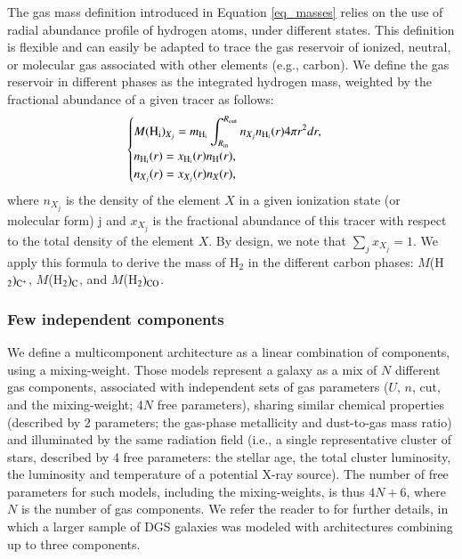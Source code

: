 \documentclass{aa}
\begin{document}
The gas mass definition introduced in Equation \ref{eq_masses} relies on the use of radial abundance profile of hydrogen atoms, under different states. This definition is flexible and can easily be adapted to trace the gas reservoir of ionized, neutral, or molecular gas associated with other elements (e.g., carbon). We define the gas reservoir in different phases as the integrated hydrogen mass, weighted by the fractional abundance of a given tracer as follows:
\begin{equation}
    \label{eq_masses_zone}
    \begin{cases}
    \displaystyle M({\rm H_i})_{X_j} = m_{\rm H_i} \int_{R_{\rm in}}^{R_{\rm out}}n_{X_j} n_{\rm H_i}(r) 4\pi r^2 dr , \\
    \displaystyle n_{\rm H_i}(r) = x_{\rm H_i}(r) n_{\rm H}(r), \\
    \displaystyle n_{X_j}(r) = x_{X_j}(r) n_{X}(r), 
    \end{cases}    
\end{equation}
where $n_{X_j}$ is the density of the element $X$ in a given ionization state (or molecular form) j and $x_{X_j}$ is the fractional abundance of this tracer with respect to the total density of the element $X$. By design, we note that $\sum_{j} x_{X_j}=1$. We apply this formula to derive the mass of H$_2$ in the different carbon phases: $M$(H$_2)_{\rm C^+}$, $M$(H$_2)_{\rm C}$, and $M$(H$_2)_{\rm CO}$. %

\subsubsection{Few independent components}
\label{subsec_multi_comp}

We define a multicomponent architecture as a linear combination of components, using a mixing-weight. Those models represent a galaxy as a mix of $N$ different gas components, associated with independent sets of gas parameters ($U$, $n$, cut, and the mixing-weight; 4$N$ free parameters), sharing similar chemical properties (described by 2 parameters; the gas-phase metallicity and dust-to-gas mass ratio) and illuminated by the same radiation field (i.e., a single representative cluster of stars, described by 4 free  parameters: the stellar age, the total cluster luminosity, the luminosity and temperature of a potential X-ray source). The number of free parameters for such models, including the mixing-weights, is thus $4N+6$, where $N$ is the number of gas components. We refer the reader to \cite{Ramambason2022} for further details, in which a larger sample of DGS galaxies was modeled with architectures combining up to three components. 
\end{document}
